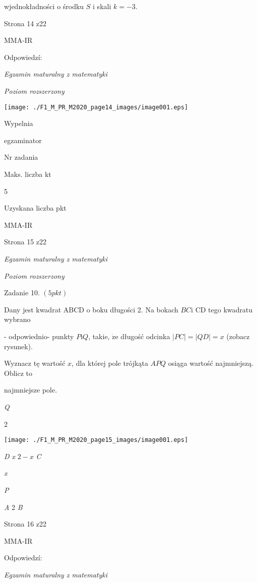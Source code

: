 \documentclass[a4paper,12pt]{article}
\begin{document}
wjednokładności o środku $S$ i skali $k=-3.$

Strona 14 z22

MMA-IR





Odpowiedzí:

{\it Egzamin maturalny z matematyki}

{\it Poziom rozszerzony}
\begin{center}
\texttt{[image: ./F1\_M\_PR\_M2020\_page14\_images/image001.eps]}
\end{center}
Wypelnia

egzaminator

Nr zadania

Maks. liczba kt

5

Uzyskana liczba pkt

MMA-IR

Strona 15 z22





{\it Egzamin maturalny z matematyki}

{\it Poziom rozszerzony}

Zadanie 10. $(5pkt)$

Dany jest kwadrat ABCD o boku długości 2. Na bokach $BC\mathrm{i}$ CD tego kwadratu wybrano

- odpowiednio- punkty $P\mathrm{i}Q$, takie, $\dot{\mathrm{z}}\mathrm{e}$ długość odcinka $|PC|=|QD|=x$ (zobacz rysunek).

Wyznacz tę wartość $x$, dla której pole trójkąta $APQ$ osiąga wartość najmniejszą. Oblicz to

najmniejsze pole.

{\it Q}

2
\begin{center}
\texttt{[image: ./F1\_M\_PR\_M2020\_page15\_images/image001.eps]}
\end{center}
{\it D  x}  $2-x$  {\it C}

{\it x}

{\it P}

{\it A} 2  {\it B}

Strona 16 z22

MMA-IR





Odpowiedzí:

{\it Egzamin maturalny z matematyki}
\end{document}
